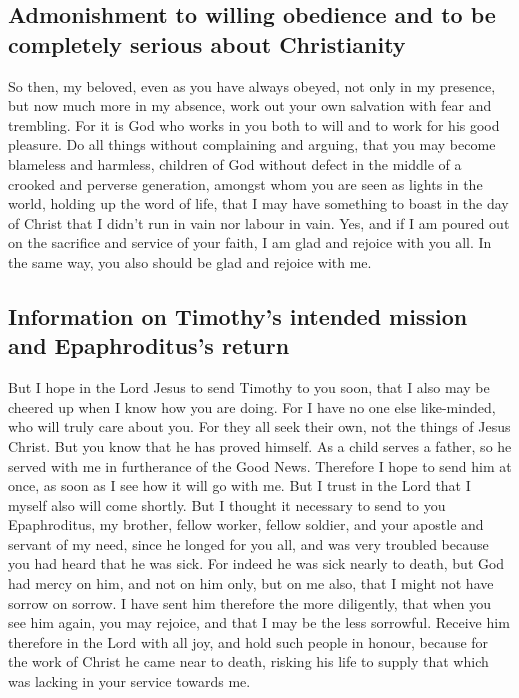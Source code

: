 \hypertarget{admonishment-to-willing-obedience-and-to-be-completely-serious-about-christianity}{%
\subsection{Admonishment to willing obedience and to be completely
serious about
Christianity}\label{admonishment-to-willing-obedience-and-to-be-completely-serious-about-christianity}}

 So then, my beloved, even as you have always obeyed, not
only in my presence, but now much more in my absence, work out your own
salvation with fear and trembling.  For it is God who
works in you both to will and to work for his good pleasure.
 Do all things without complaining and arguing,
 that you may become blameless and harmless, children of
God without defect in the middle of a crooked and perverse generation,
amongst whom you are seen as lights in the world, 
holding up the word of life, that I may have something to boast in the
day of Christ that I didn't run in vain nor labour in vain.
 Yes, and if I am poured out on the sacrifice and service
of your faith, I am glad and rejoice with you all.  In
the same way, you also should be glad and rejoice with me.

\hypertarget{information-on-timothys-intended-mission-and-epaphrodituss-return}{%
\subsection{Information on Timothy's intended mission and Epaphroditus's
return}\label{information-on-timothys-intended-mission-and-epaphrodituss-return}}

 But I hope in the Lord Jesus to send Timothy to you
soon, that I also may be cheered up when I know how you are doing.
 For I have no one else like-minded, who will truly care
about you.  For they all seek their own, not the things
of Jesus Christ.  But you know that he has proved
himself. As a child serves a father, so he served with me in furtherance
of the Good News.  Therefore I hope to send him at once,
as soon as I see how it will go with me.  But I trust in
the Lord that I myself also will come shortly.  But I
thought it necessary to send to you Epaphroditus, my brother, fellow
worker, fellow soldier, and your apostle and servant of my need,
 since he longed for you all, and was very troubled
because you had heard that he was sick.  For indeed he
was sick nearly to death, but God had mercy on him, and not on him only,
but on me also, that I might not have sorrow on sorrow. 
I have sent him therefore the more diligently, that when you see him
again, you may rejoice, and that I may be the less sorrowful.
 Receive him therefore in the Lord with all joy, and hold
such people in honour,  because for the work of Christ he
came near to death, risking his life to supply that which was lacking in
your service towards me.

